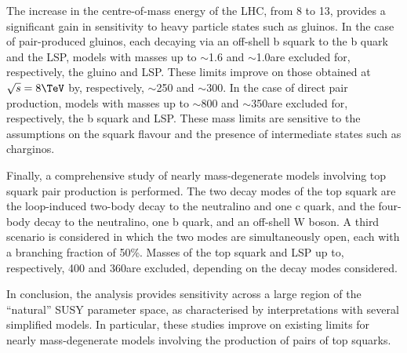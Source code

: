 The increase in the centre-of-mass energy of the LHC, from 8 to
13\TeV, provides a significant gain in sensitivity to heavy particle
states such as gluinos. In the case of pair-produced gluinos, each
decaying via an off-shell b squark to the b quark and the LSP, models
with masses up to $\sim$1.6 and $\sim$1.0\TeV are excluded for,
respectively, the gluino and LSP. These limits improve on those
obtained at $\sqrt{s} = 8\TeV$ by, respectively, $\sim$250 and
$\sim$300\GeV. In the case of direct pair production, models with
masses up to $\sim$800 and $\sim$350\GeV are excluded for,
respectively, the b squark and LSP. These mass limits are sensitive to
the assumptions on the squark flavour and the presence of intermediate
states such as charginos.

Finally, a comprehensive study of nearly mass-degenerate models
involving top squark pair production is performed. The two decay modes
of the top squark are the loop-induced two-body decay to the
neutralino and one c quark, and the four-body decay to the neutralino,
one b quark, and an off-shell W boson. A third scenario is considered
in which the two modes are simultaneously open, each with a branching
fraction of 50\%. Masses of the top squark and LSP up to,
respectively, 400 and 360\GeV are excluded, depending on the decay
modes considered.

In conclusion, the analysis provides sensitivity across a large region
of the ``natural'' SUSY parameter space, as characterised by
interpretations with several simplified models. In particular, these
studies improve on existing limits for nearly mass-degenerate models
involving the production of pairs of top squarks.
